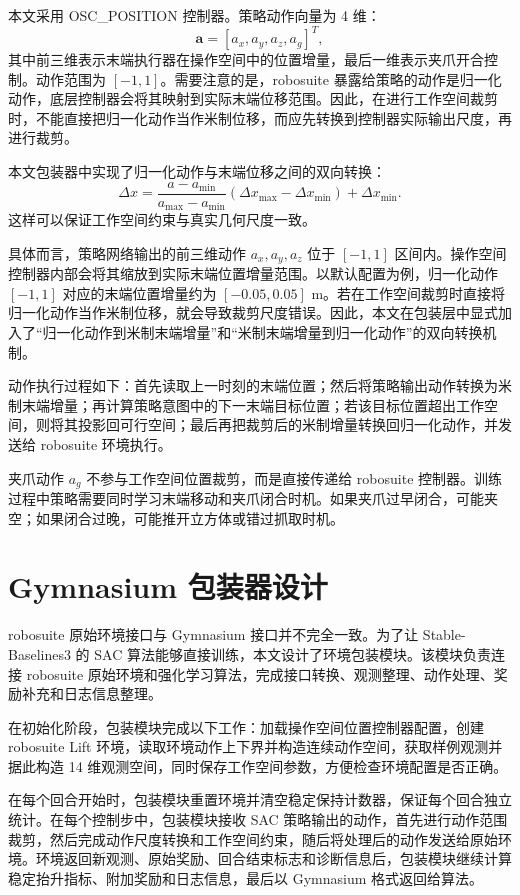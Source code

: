 \documentclass[
    type = bachelor,
    oneside,
    fontset = fandol
]{njuthesis}
\begin{document}
本文采用 OSC\_POSITION 控制器。策略动作向量为 4 维：
\begin{equation}
  \boldsymbol{a}=[a_x,a_y,a_z,a_g]^T,
\end{equation}
其中前三维表示末端执行器在操作空间中的位置增量，最后一维表示夹爪开合控制。动作范围为 $[-1,1]$。需要注意的是，robosuite 暴露给策略的动作是归一化动作，底层控制器会将其映射到实际末端位移范围。因此，在进行工作空间裁剪时，不能直接把归一化动作当作米制位移，而应先转换到控制器实际输出尺度，再进行裁剪。

本文包装器中实现了归一化动作与末端位移之间的双向转换：
\begin{equation}
  \Delta x = \frac{a-a_{\min}}{a_{\max}-a_{\min}}
  (\Delta x_{\max}-\Delta x_{\min})+\Delta x_{\min}.
\end{equation}
这样可以保证工作空间约束与真实几何尺度一致。

具体而言，策略网络输出的前三维动作 $a_x,a_y,a_z$ 位于 $[-1,1]$ 区间内。操作空间控制器内部会将其缩放到实际末端位置增量范围。以默认配置为例，归一化动作 $[-1,1]$ 对应的末端位置增量约为 $[-0.05,0.05]$ m。若在工作空间裁剪时直接将归一化动作当作米制位移，就会导致裁剪尺度错误。因此，本文在包装层中显式加入了“归一化动作到米制末端增量”和“米制末端增量到归一化动作”的双向转换机制。

动作执行过程如下：首先读取上一时刻的末端位置；然后将策略输出动作转换为米制末端增量；再计算策略意图中的下一末端目标位置；若该目标位置超出工作空间，则将其投影回可行空间；最后再把裁剪后的米制增量转换回归一化动作，并发送给 robosuite 环境执行。

夹爪动作 $a_g$ 不参与工作空间位置裁剪，而是直接传递给 robosuite 控制器。训练过程中策略需要同时学习末端移动和夹爪闭合时机。如果夹爪过早闭合，可能夹空；如果闭合过晚，可能推开立方体或错过抓取时机。

\section{Gymnasium 包装器设计}

robosuite 原始环境接口与 Gymnasium 接口并不完全一致。为了让 Stable-Baselines3 的 SAC 算法能够直接训练，本文设计了环境包装模块。该模块负责连接 robosuite 原始环境和强化学习算法，完成接口转换、观测整理、动作处理、奖励补充和日志信息整理。

在初始化阶段，包装模块完成以下工作：加载操作空间位置控制器配置，创建 robosuite Lift 环境，读取环境动作上下界并构造连续动作空间，获取样例观测并据此构造 14 维观测空间，同时保存工作空间参数，方便检查环境配置是否正确。

在每个回合开始时，包装模块重置环境并清空稳定保持计数器，保证每个回合独立统计。在每个控制步中，包装模块接收 SAC 策略输出的动作，首先进行动作范围裁剪，然后完成动作尺度转换和工作空间约束，随后将处理后的动作发送给原始环境。环境返回新观测、原始奖励、回合结束标志和诊断信息后，包装模块继续计算稳定抬升指标、附加奖励和日志信息，最后以 Gymnasium 格式返回给算法。
\end{document}
